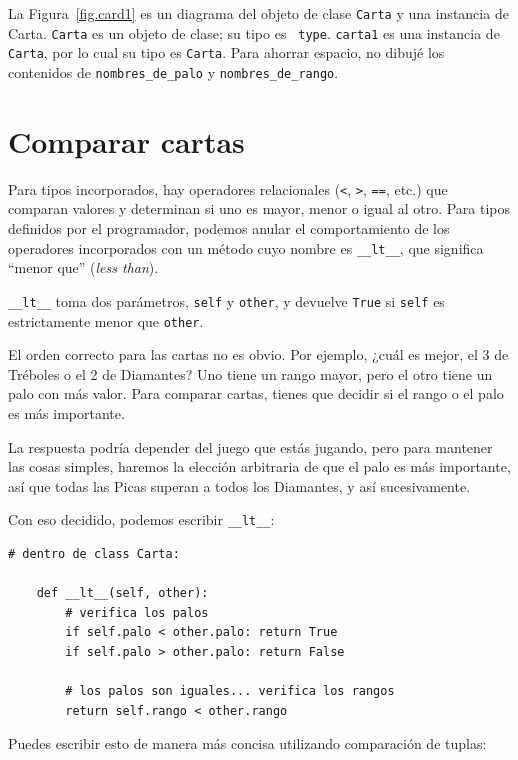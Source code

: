 \documentclass[10pt]{book}
\begin{document}
La Figura~\ref{fig.card1} es un diagrama del objeto de clase {\tt Carta} y
una instancia de Carta.  {\tt Carta} es un objeto de clase; su tipo es {\tt
  type}.  {\tt carta1} es una instancia de {\tt Carta}, por lo cual su tipo es
{\tt Carta}.  Para ahorrar espacio, no dibujé los contenidos de
\verb"nombres_de_palo" y \verb"nombres_de_rango".  
  


\section{Comparar cartas}
\label{comparecard}

Para tipos incorporados, hay operadores relacionales
({\tt <}, {\tt >}, {\tt ==}, etc.)
que comparan
valores y determinan si uno es mayor, menor o igual al
otro.  Para tipos definidos por el programador, podemos anular el comportamiento de
los operadores incorporados con un método cuyo nombre es
\verb"__lt__", que significa ``menor que'' ({\em less than}).

\verb"__lt__" toma dos parámetros, {\tt self} y {\tt other},
y devuelve {\tt True} si {\tt self} es estrictamente menor que {\tt other}.

El orden correcto para las cartas no es obvio.
Por ejemplo, ¿cuál
es mejor, el 3 de Tréboles o el 2 de Diamantes?  Uno tiene un rango
mayor, pero el otro tiene un palo con más valor.  Para comparar
cartas, tienes que decidir si el rango o el palo es más importante.

La respuesta podría depender del juego que estás jugando, pero para mantener
las cosas simples, haremos la elección arbitraria de que el palo es más
importante, así que todas las Picas superan a todos los Diamantes,
y así sucesivamente.

Con eso decidido, podemos escribir \verb"__lt__":

\begin{verbatim}
# dentro de class Carta:

    def __lt__(self, other):
        # verifica los palos
        if self.palo < other.palo: return True
        if self.palo > other.palo: return False

        # los palos son iguales... verifica los rangos
        return self.rango < other.rango
\end{verbatim}
%
Puedes escribir esto de manera más concisa utilizando comparación de tuplas:
\end{document}
